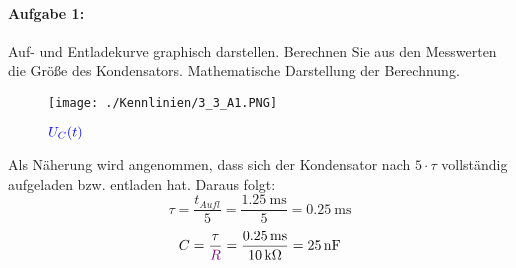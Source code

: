 \documentclass[a4paper,titlepage,parskip]{scrreprt}
\newcommand{\spannung}[1]{\textcolor{blue}{#1}}
\newcommand{\widerstand}[1]{\textcolor{violet}{#1}}
\begin{document}
                \paragraph{Aufgabe 1:}Auf- und Entladekurve graphisch darstellen. Berechnen Sie aus den Messwerten die Größe des Kondensators. Mathematische Darstellung der Berechnung.
                	  
                	  \begin{figure}[!htbp]
              			\begin{center}
                  			\texttt{[image: ./Kennlinien/3\_3\_A1.PNG]}
                		\end{center}
                		\caption{$\spannung{U_C(t)}$}
                		\label{fig:1_1_A3}
            		  \end{figure} 
            		  
            		  Als Näherung wird angenommen, dass sich der Kondensator nach $5 \cdot \tau$ vollständig aufgeladen bzw. entladen hat. Daraus folgt:
            		  \begin{equation*}
            		  	\tau = \frac{t_{Aufl}}{5} = \frac{\SI{1,25}{\milli\second}}{5} = \SI{0,25}{\milli\second}						
            		  	\end{equation*}
            		  \begin{equation*}
            		  	C = \frac{\tau}{\widerstand{R}} = \frac{\SI{0,25}{\milli\second}}{\SI{10}{\kilo\ohm}} = \SI{25}{\nano\farad}
            		  \end{equation*}
\end{document}
